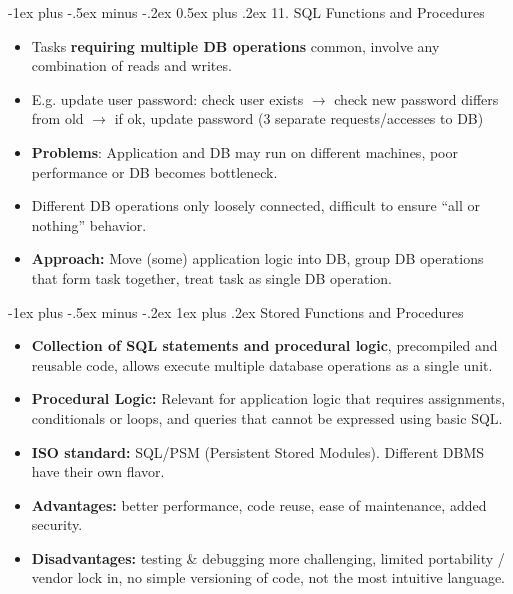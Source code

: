 \documentclass[12pt, landscape]{article}
\makeatletter
\renewcommand{\section}{\@startsection{section}{1}{0mm}%
                                {-1ex plus -.5ex minus -.2ex}%
                                {0.5ex plus .2ex}%
                                {\normalfont\large\bfseries}}
\renewcommand{\subsubsection}{\@startsection{subsubsection}{3}{0.1mm}%
                                {-1ex plus -.5ex minus -.2ex}%
                                {1ex plus .2ex}%
                                {\normalfont\small\bfseries}}
\makeatother
\begin{document}
\begin{multicols*}{3}
\vfill \null
\columnbreak

\vfill \null
\columnbreak

\section{11. SQL Functions and Procedures}
\begin{itemize}
\item Tasks \textbf{requiring multiple DB operations} common, involve any combination of reads and writes. 
\item E.g. update user password: check user exists $\rightarrow$ check new password differs from old $\rightarrow$ if ok, update password (3 separate requests/accesses to DB)
\item \textbf{Problems}: Application and DB may run on different machines, poor performance or DB becomes bottleneck. 
\item Different DB operations only loosely connected, difficult to ensure ``all or nothing'' behavior.
\item \textbf{Approach:} Move (some) application logic into DB, group DB operations that form task together, treat task as single DB operation.
 \end{itemize}

\bigskip


\subsubsection{Stored Functions and Procedures}
\begin{itemize}
\item \textbf{Collection of SQL statements and procedural logic}, precompiled and reusable code, allows execute multiple database operations as a single unit.
\item \textbf{Procedural Logic:} Relevant for application logic that requires assignments, conditionals or loops, and queries that cannot be expressed using basic SQL.
\item \textbf{ISO standard:} SQL/PSM (Persistent Stored Modules). Different DBMS have their own flavor.
\item \textbf{Advantages:} better performance, code reuse, ease of maintenance, added security.
\item \textbf{Disadvantages:} testing \& debugging more challenging, limited portability / vendor lock in, no simple versioning of code, not the most intuitive language.
 \end{itemize}
 

\end{multicols*}
\end{document}
